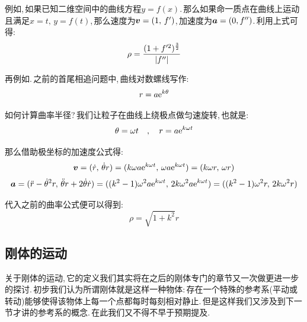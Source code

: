 例如,\,如果已知二维空间中的曲线方程$y=f(x)$.\,那么如果命一质点在曲线上运动且满足$x=t,\,y=f(t)$,\,那么速度为$\boldsymbol{v}=(1,\,f')$,\,加速度为$\boldsymbol{a}=(0,f'')$.\,利用上式可得:
\[\rho=\frac{(1+f'^2)^\frac{3}{2}}{\left| f'' \right|}\]

再例如.\,之前的首尾相追问题中,\,曲线对数螺线写作:
\[r=a{\rm e}^{k\theta}\]

如何计算曲率半径?\,我们让粒子在曲线上绕极点做匀速旋转,\,也就是:
\[\theta=\omega t\quad,\quad r=a{\rm e}^{k\omega t}\]

那么借助极坐标的加速度公式得:
\[\boldsymbol{v}=(\dot{r},\,\dot{\theta}r)=(k\omega a{\rm e}^{k\omega t},\,\omega a{\rm e}^{k\omega t})=(k\omega r,\,\omega r)\]
\[\boldsymbol{a}=(\ddot{r}-\dot{\theta}^2r,\,\ddot{\theta}r+2\dot{\theta}\dot{r})=((k^2-1)\omega^2 a{\rm e}^{k\omega t},\,2k\omega^2 a{\rm e}^{k\omega t})=((k^2-1)\omega^2 r,\,2k\omega^2 r)\]

代入之前的曲率公式便可以得到:
\[\rho=\sqrt{1+k^2}r\]

\subsection{刚体的运动}

关于刚体的运动,\,它的定义我们其实将在之后的刚体专门的章节又一次做更进一步的探讨.\,初步我们认为所谓刚体就是这样一种物体:\,存在一个特殊的参考系(平动或转动)能够使得该物体上每一个点都每时每刻相对静止.\,但是这样我们又涉及到下一节才讲的参考系的概念.\,在此我们又不得不早于预期提及.

